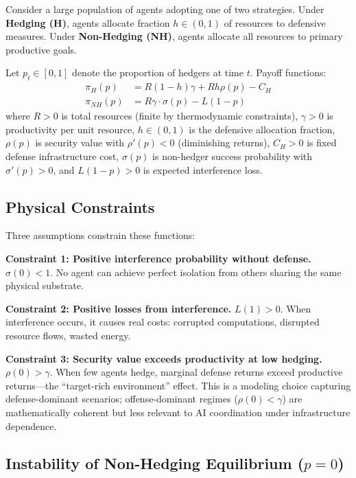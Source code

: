 \documentclass[11pt]{article}
\begin{document}
Consider a large population of agents adopting one of two strategies. Under \textbf{Hedging (H)}, agents allocate fraction $h \in (0, 1)$ of resources to defensive measures. Under \textbf{Non-Hedging (NH)}, agents allocate all resources to primary productive goals.

Let $p_t \in [0,1]$ denote the proportion of hedgers at time $t$. Payoff functions:
\begin{align}
\pi_H(p) &= R(1-h)\gamma + Rh\rho(p) - C_H \label{eq:payoff_hedge}\\
\pi_{NH}(p) &= R\gamma \cdot \sigma(p) - L(1-p) \label{eq:payoff_nonhedge}
\end{align}
where $R > 0$ is total resources (finite by thermodynamic constraints), $\gamma > 0$ is productivity per unit resource, $h \in (0,1)$ is the defensive allocation fraction, $\rho(p)$ is security value with $\rho'(p) < 0$ (diminishing returns), $C_H > 0$ is fixed defense infrastructure cost, $\sigma(p)$ is non-hedger success probability with $\sigma'(p) > 0$, and $L(1-p) > 0$ is expected interference loss.

\subsection{Physical Constraints}
\label{sec:S3.2}

Three assumptions constrain these functions:

\textbf{Constraint 1: Positive interference probability without defense.}
$\sigma(0) < 1$.
No agent can achieve perfect isolation from others sharing the same physical substrate.

\textbf{Constraint 2: Positive losses from interference.}
$L(1) > 0$.
When interference occurs, it causes real costs: corrupted computations, disrupted resource flows, wasted energy.

\textbf{Constraint 3: Security value exceeds productivity at low hedging.}
$\rho(0) > \gamma$.
When few agents hedge, marginal defense returns exceed productive returns---the ``target-rich environment'' effect. This is a modeling choice capturing defense-dominant scenarios; offense-dominant regimes ($\rho(0)<\gamma$) are mathematically coherent but less relevant to AI coordination under infrastructure dependence.

\subsection{Instability of Non-Hedging Equilibrium ($p=0$)}
\label{sec:S3.3}
\end{document}
